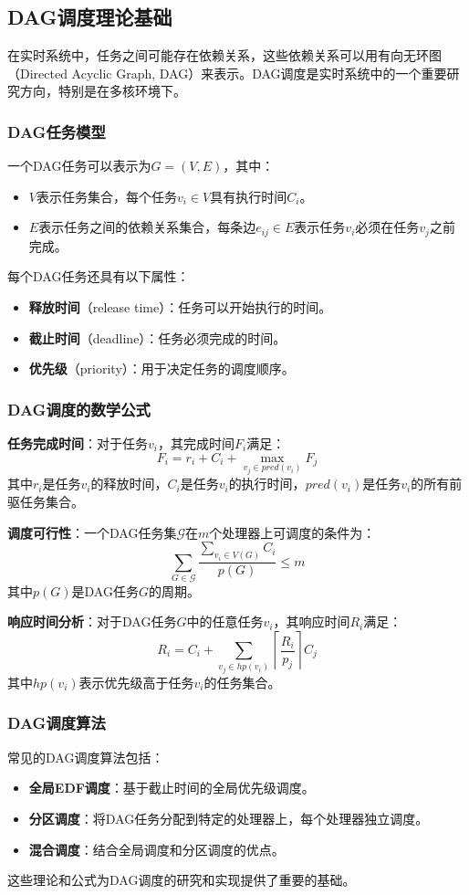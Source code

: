 \subsection{DAG调度理论基础}

在实时系统中，任务之间可能存在依赖关系，这些依赖关系可以用有向无环图（Directed Acyclic Graph, DAG）来表示。DAG调度是实时系统中的一个重要研究方向，特别是在多核环境下。

\subsubsection{DAG任务模型}

一个DAG任务可以表示为$G = (V, E)$，其中：
\begin{itemize}
    \item $V$表示任务集合，每个任务$v_i \in V$具有执行时间$C_i$。
    \item $E$表示任务之间的依赖关系集合，每条边$e_{ij} \in E$表示任务$v_i$必须在任务$v_j$之前完成。
\end{itemize}

每个DAG任务还具有以下属性：
\begin{itemize}
    \item \textbf{释放时间}（release time）：任务可以开始执行的时间。
    \item \textbf{截止时间}（deadline）：任务必须完成的时间。
    \item \textbf{优先级}（priority）：用于决定任务的调度顺序。
\end{itemize}

\subsubsection{DAG调度的数学公式}

\textbf{任务完成时间}：对于任务$v_i$，其完成时间$F_i$满足：
$$F_i = r_i + C_i + \max_{v_j \in pred(v_i)} F_j$$
其中$r_i$是任务$v_i$的释放时间，$C_i$是任务$v_i$的执行时间，$pred(v_i)$是任务$v_i$的所有前驱任务集合。

\textbf{调度可行性}：一个DAG任务集$\mathcal{G}$在$m$个处理器上可调度的条件为：
$$\sum_{G \in \mathcal{G}} \frac{\sum_{v_i \in V(G)} C_i}{p(G)} \leq m$$
其中$p(G)$是DAG任务$G$的周期。

\textbf{响应时间分析}：对于DAG任务$G$中的任意任务$v_i$，其响应时间$R_i$满足：
$$R_i = C_i + \sum_{v_j \in hp(v_i)} \left\lceil \frac{R_i}{p_j} \right\rceil C_j$$
其中$hp(v_i)$表示优先级高于任务$v_i$的任务集合。

\subsubsection{DAG调度算法}

常见的DAG调度算法包括：
\begin{itemize}
    \item \textbf{全局EDF调度}：基于截止时间的全局优先级调度。
    \item \textbf{分区调度}：将DAG任务分配到特定的处理器上，每个处理器独立调度。
    \item \textbf{混合调度}：结合全局调度和分区调度的优点。
\end{itemize}

这些理论和公式为DAG调度的研究和实现提供了重要的基础。
